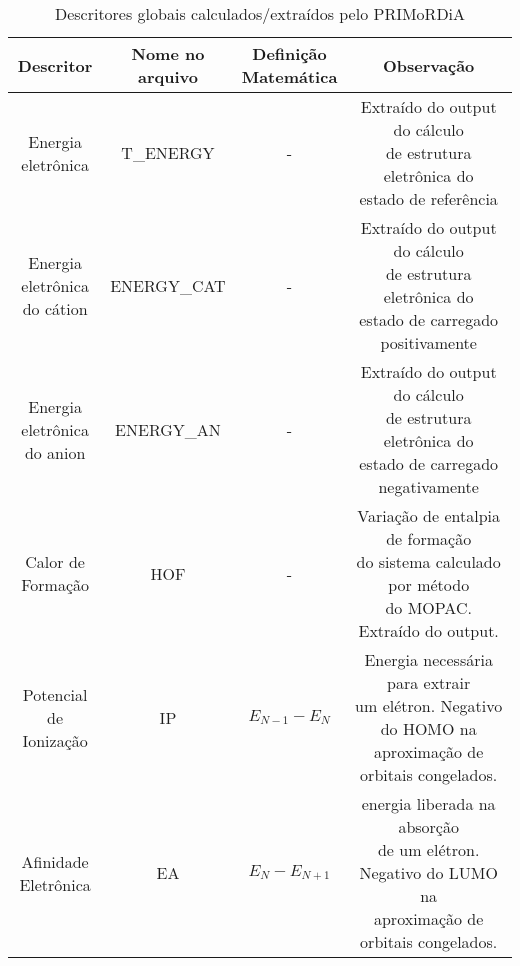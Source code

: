 \documentclass[a4paper,11pt]{refart}
\begin{document}
\hspace*{-\leftmarginwidth}
\begin{minipage}{\fullwidth}
\begin{table}[H]
\centering	
\caption{Descritores globais calculados/extraídos pelo PRIMoRDiA}
\begin{tabular}{c|c|c|c}
\toprule
Descritor &\makecell{Nome no\\ arquivo}&\makecell{Definição\\Matemática}&Observação \\
\midrule
\makecell{Energia \\eletrônica} & T\_ENERGY&-&\makecell{Extraído do output do cálculo\\ de estrutura eletrônica do \\estado de referência}\\\hline
\makecell{Energia \\eletrônica\\do cátion} &ENERGY\_CAT &-& \makecell{Extraído do output do cálculo\\ de estrutura eletrônica do \\estado de carregado positivamente}\\\hline
\makecell{Energia \\eletrônica\\do anion} &ENERGY\_AN &-&\makecell{Extraído do output do cálculo\\ de estrutura eletrônica do \\estado de carregado negativamente}\\\hline
\makecell{Calor de\\Formação} & HOF&-&\makecell{Variação de entalpia de formação\\ do sistema calculado por método\\ do MOPAC. Extraído do output.} \\\hline
\makecell{Potencial \\de Ionização} & IP & $E_{N-1}-E_{N}$ & \makecell{Energia necessária para extrair \\um elétron. Negativo do HOMO na \\aproximação de orbitais congelados.}  \\  \hline	
\makecell{Afinidade \\Eletrônica}& EA & $E_{N}-E_{N+1}$ & \makecell{energia liberada na absorção \\de um elétron. Negativo do LUMO na \\aproximação de orbitais congelados.}   \\ \hline	

\end{tabular}
\end{table}
\end{minipage}
\end{document}
